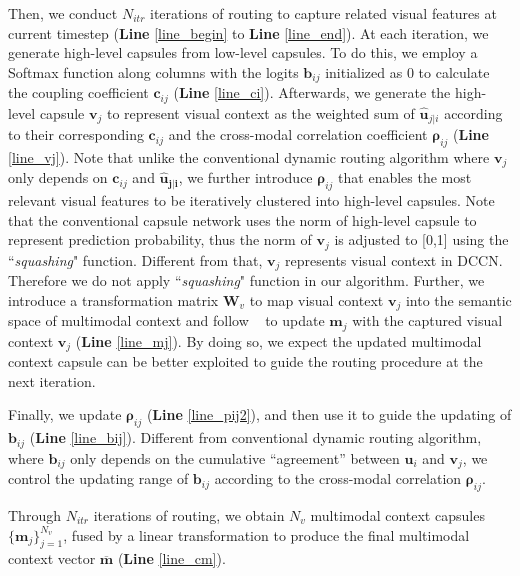 \documentclass[sigconf]{acmart}
\begin{document}
Then, 
we conduct $N_{itr}$ iterations of routing to capture related visual features at current timestep (\textbf{Line} \ref{line_begin} to \textbf{Line} \ref{line_end}).
At each iteration,
we generate high-level capsules from low-level capsules.
To do this,
we employ a Softmax function along columns with the logits $\mathbf{b}_{ij}$ initialized as 0 to calculate the coupling coefficient $\mathbf{c}_{ij}$ (\textbf{Line} \ref{line_ci}). 
Afterwards, we generate the high-level capsule $\mathbf{v}_j$ to represent visual context as the weighted sum of $\mathbf{\hat u}_{j|i}$ according to their corresponding $\mathbf{c}_{ij}$ and the cross-modal correlation coefficient $\mathbf{\rho}_{ij}$ (\textbf{Line} \ref{line_vj}). 
Note that unlike the conventional dynamic routing algorithm \cite{sabour2017dynamic} where $\mathbf{v}_{j}$ only depends on $\mathbf{c}_{ij}$ and $\mathbf{\hat{u}_{j|i}}$, 
we further introduce $\mathbf{\rho}_{ij}$ that enables the most relevant visual features to be iteratively clustered into high-level capsules.
Note that the conventional capsule network \cite{sabour2017dynamic} uses the norm of high-level capsule to represent prediction probability, thus the norm of $\mathbf{v}_j$ is adjusted to [0,1] using the ``\emph{squashing}" function.   
Different from that, $\mathbf{v}_j$ represents visual context in DCCN. Therefore we do not apply ``\emph{squashing}" function in our algorithm. 
Further, we introduce a transformation matrix $\mathbf{W}_v$ to map visual context $\mathbf{v}_j$ into the semantic space of multimodal context and follow \citeauthor{wu2019faithful}~ to update $\mathbf{m}_j$ with the captured visual context $\mathbf{v}_j$ (\textbf{Line} \ref{line_mj}). By doing so, 
we expect the updated multimodal context capsule can be better exploited to guide the routing procedure at the next iteration. 

Finally, we update $\mathbf{\rho}_{ij}$ (\textbf{Line }\ref{line_pij2}), and then use it to guide the updating of $\mathbf{b}_{ij}$ (\textbf{Line }\ref{line_bij}). Different from conventional dynamic routing algorithm, where $\mathbf{b}_{ij}$ only depends on the cumulative ``agreement'' between $\mathbf{u}_i$ and $\mathbf{v}_j$, we control the updating range of $\mathbf{b}_{ij}$ according to the cross-modal correlation $\mathbf{\rho}_{ij}$.


Through $N_{itr}$ iterations of routing, we obtain $N_{v}$ multimodal context capsules  $\{\mathbf{m}_j\}^{N_{v}}_{j=1}$,  fused by a linear transformation to produce the final multimodal context vector $\mathbf{\overline{m}}$ (\textbf{Line} \ref{line_cm}). 
\end{document}
